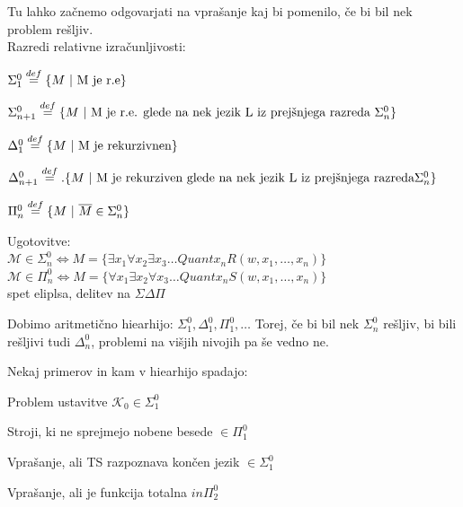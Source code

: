 \documentclass[10pt,a4paper,oneside]{book}
\begin{document}
\br
Tu lahko začnemo odgovarjati na vprašanje kaj bi pomenilo, če bi bil nek problem rešljiv.\\
Razredi relativne izračunljivosti:
\begin{items}
\item $\Sigma_1^0 \overset{def}{=} \{ M\ |\ \mbox{M je r.e}\}$
\item $\Sigma_{n+1}^0 \overset{def}{=} \{ M\ |\ \mbox{M je r.e. glede na nek jezik L iz prejšnjega razreda } \Sigma_n^0\}$
\item $\Delta_1^0 \overset{def}{=} \{ M\ |\ \mbox{M je rekurzivnen} \}$
\item $\Delta_{n+1}^0 \overset{def}{=}. \{ M\ |\ \mbox{M je rekurziven glede na nek jezik L iz prejšnjega razreda} \Sigma_n^0\}$%
\item $\Pi_n^0 \overset{def}{=} \{ M\ |\ \overline{M} \in \Sigma_n^0 \}$
\end{items}

Ugotovitve:\\%
$\mathcal{M} \in \Sigma_n^0 \Longleftrightarrow M=\{ \exists x_1 \forall x_2 \exists x_3 \dots Quant x_n R(w, x_1,\dots,x_n)\}$\\ %
$\mathcal{M} \in \Pi_n^0 \Longleftrightarrow M=\{ \forall x_1 \exists x_2 \forall x_3 \dots Quant x_n S(w, x_1,\dots,x_n)\}$\\ %
\fixme spet eliplsa, delitev na $\Sigma \Delta \Pi$

Dobimo aritmetično hiearhijo: $\Sigma_1^0, \Delta_1^0, \Pi_1^0, \dots$
Torej, če bi bil nek $\Sigma_n^0$ rešljiv, bi bili rešljivi tudi $\Delta_n^0$, problemi na višjih nivojih pa še vedno ne.

Nekaj primerov in kam v hiearhijo spadajo:
\begin{items}
\item Problem ustavitve $\mathcal{K}_0 \in \Sigma_1^0$
\item Stroji, ki ne sprejmejo nobene besede $\in \Pi_1^0$
\item Vprašanje, ali TS razpoznava končen jezik $\in \Sigma_1^0$
\item Vprašanje, ali je funkcija totalna $in \Pi_2^0$
\end{items}
\end{document}
